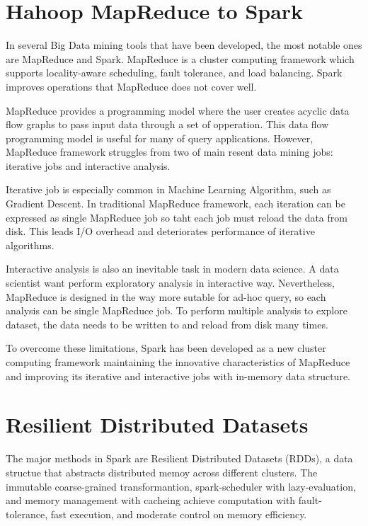 \section{Hahoop MapReduce to Spark}
\label{sec:history}
In several Big Data mining tools that have been developed, the most notable ones are MapReduce and Spark. MapReduce is a cluster computing framework 
which supports locality-aware scheduling, fault tolerance, and load balancing. Spark improves operations that MapReduce does not cover well. 

MapReduce provides a programming model where the user creates acyclic data flow graphs to pass input data through a set of opperation. This 
data flow programming model is useful for many of query applications. However, MapReduce framework struggles from two of main resent data mining jobs: iterative jobs and interactive analysis. 

Iterative job is especially common in Machine Learning Algorithm, such as Gradient Descent. In traditional MapReduce framework, each iteration can be expressed as single MapReduce job 
so taht each job must reload the data from disk. This leads I/O overhead and deteriorates performance of iterative algorithms. 

Interactive analysis is also an inevitable task in modern data science. A data scientist want perform exploratory analysis in interactive way. 
Nevertheless, MapReduce is designed in the way more sutable for ad-hoc query, so each analysis can be single MapReduce job. 
To perform multiple analysis to explore dataset, the data needs to be written to and reload from disk many times. 

To overcome these limitations, Spark has been developed as a new cluster computing framework maintaining the innovative characteristics of MapReduce and improving 
its iterative and interactive jobs with in-memory data structure.


\section{Resilient Distributed Datasets}
\label{sec:history}
The major methods in Spark are Resilient Distributed Datasets (RDDs), a data structue that abstracts distributed memoy across different clusters. 
The immutable coarse-grained transformantion, spark-scheduler with lazy-evaluation, and memory management with cacheing achieve computation with fault-tolerance, 
fast execution, and moderate control on memory efficiency.

